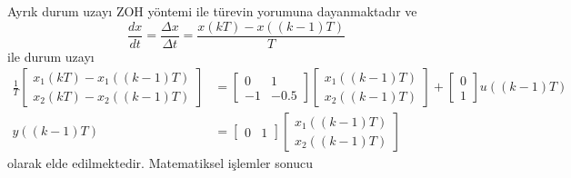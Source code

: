 Ayrık durum uzayı ZOH yöntemi ile türevin yorumuna dayanmaktadır ve 
\begin{equation}
    \frac{dx}{dt}=\frac{\Delta x}{\Delta t}=\frac{x(kT)-x((k-1)T)}{T}
\end{equation}
ile durum uzayı
\begin{equation}
    \begin{split}
        \frac{1}{T}\begin{bmatrix}
            x_1(kT)-x_1((k-1)T)\\
            x_2(kT)-x_2((k-1)T)
        \end{bmatrix}&=
        \begin{bmatrix}
            0& 1\\
            -1& -0.5
        \end{bmatrix}\begin{bmatrix}
            x_1((k-1)T)\\
            x_2((k-1)T)
        \end{bmatrix}+\begin{bmatrix}
            0\\
            1
        \end{bmatrix}u((k-1)T)\\
        y((k-1)T)&=\begin{bmatrix}
            0& 1
        \end{bmatrix}\begin{bmatrix}
            x_1((k-1)T)\\
            x_2((k-1)T)
        \end{bmatrix}
    \end{split}
\end{equation}
olarak elde edilmektedir. Matematiksel işlemler sonucu
